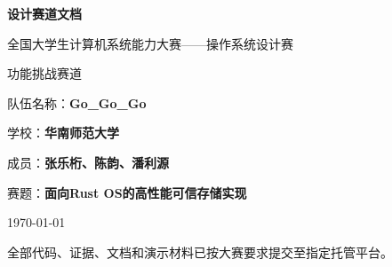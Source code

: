 \documentclass[12pt,a4paper]{report}
\begin{document}
\begin{titlepage}
    \centering
    \vspace*{1.5cm}
    
    {\Huge\bfseries 设计赛道文档\par}
    \vspace{0.8cm}
    {\Large 全国大学生计算机系统能力大赛——操作系统设计赛\par}
    \vspace{0.3cm}
    {\large 功能挑战赛道\par}
    \vspace{1.5cm}
    
    {\large 队伍名称：\textbf{Go\_Go\_Go}\par}
    {\large 学校：\textbf{华南师范大学}\par}
    {\large 成员：\textbf{张乐桁、陈韵、潘利源}\par}
    \vspace{0.3cm}
    {\large 赛题：\textbf{面向Rust OS的高性能可信存储实现}\par}
    \vspace{1.5cm}
    
    {\large \today\par}
    
    \vfill
    {\small 全部代码、证据、文档和演示材料已按大赛要求提交至指定托管平台。}
\end{titlepage}

\tableofcontents
\clearpage





















\end{document}
